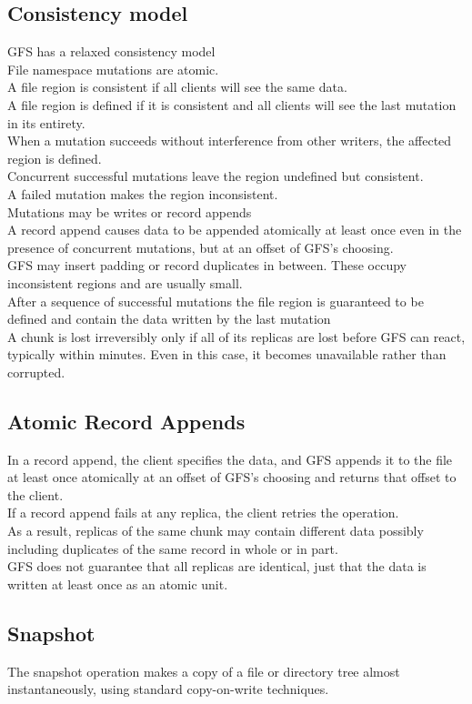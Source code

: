 \subsection{Consistency model}
GFS has a relaxed consistency model\\
File namespace mutations are atomic.\\
A file region is consistent if all clients will see the same data.\\
A file region is defined if it is consistent and all clients will see the last mutation in its entirety. \\
When a mutation succeeds without interference from other writers, the affected region is defined.\\
Concurrent successful mutations leave the region undefined but consistent.\\
A failed mutation makes the region inconsistent.\\
Mutations may be writes or record appends\\
A record append causes data to be appended atomically at least once even in the presence of concurrent mutations, but at an offset of GFS's choosing.\\
GFS may insert padding or record duplicates in between. These occupy inconsistent regions and are usually small.\\
After a sequence of successful mutations the file region is guaranteed to be defined and contain the data written by the last mutation \\
A chunk is lost irreversibly only if all of its replicas are lost before GFS can react, typically within minutes. Even in this case, it becomes unavailable rather than corrupted.
\subsection{Atomic Record Appends}
In a record append, the client specifies the data, and GFS appends it to the file at least once atomically at an offset of GFS's choosing and returns that offset to the client.\\
If a record append fails at any replica, the client retries the operation. \\
As a result, replicas of the same chunk may contain different data possibly including duplicates of the same record in whole or in part. \\
GFS does not guarantee that all replicas are identical, just that the data is written at least once as an atomic unit.
\subsection{Snapshot}
The snapshot operation makes a copy of a file or directory tree almost instantaneously, using standard copy-on-write techniques.
